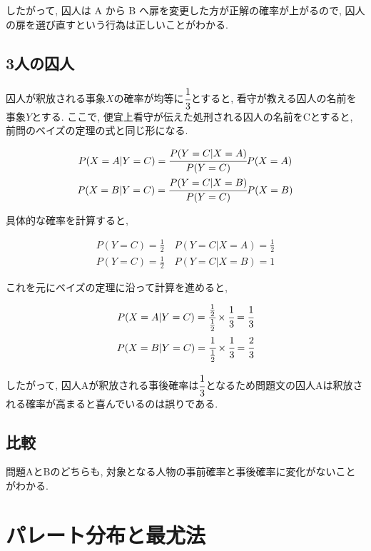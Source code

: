 \documentclass{article}
\begin{document}
したがって, 囚人は A から B へ扉を変更した方が正解の確率が上がるので, 囚人の扉を選び直すという行為は正しいことがわかる.

\subsection{3人の囚人}

囚人が釈放される事象$X$の確率が均等に$\cfrac{1}{3}$とすると, 看守が教える囚人の名前を事象$Y$とする. ここで, 便宜上看守が伝えた処刑される囚人の名前をCとすると, 前問のベイズの定理の式と同じ形になる.

\begin{center}
	\begin{gather}
		P(X = A | Y = C) = \cfrac{P(Y = C | X = A)}{P(Y = C)} P(X = A) \\
		P(X = B | Y = C) = \cfrac{P(Y = C | X = B)}{P(Y = C)} P(X = B)
	\end{gather}
\end{center}

具体的な確率を計算すると,

\begin{center}
	\begin{gather}
		P(Y = C) = \frac{1}{2}\quad P(Y = C | X = A) = \frac{1}{2} \\
		P(Y = C) = \frac{1}{2}\quad P(Y = C | X = B) = 1
	\end{gather}
\end{center}

これを元にベイズの定理に沿って計算を進めると,

\begin{center}
	\begin{gather}
		P(X = A | Y = C) = \cfrac{\frac{1}{2}}{\frac{1}{2}} \times \cfrac{1}{3} = \cfrac{1}{3} \\
		P(X = B | Y = C) = \cfrac{1}{\frac{1}{2}} \times \cfrac{1}{3} = \cfrac{2}{3}
	\end{gather}
\end{center}

したがって, 囚人Aが釈放される事後確率は$\cfrac{1}{3}$となるため問題文の囚人Aは釈放される確率が高まると喜んでいるのは誤りである.

\subsection{比較}

問題AとBのどちらも, 対象となる人物の事前確率と事後確率に変化がないことがわかる.

\section{パレート分布と最尤法}
\end{document}
